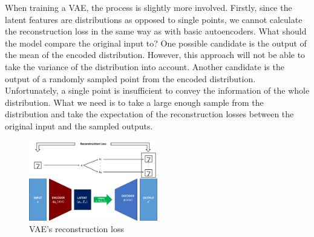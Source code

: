             When training a VAE, the process is slightly more involved. Firstly, since the latent features are distributions as opposed to single points, we cannot calculate the reconstruction loss in the same way as with basic autoencoders. What should the model compare the original input to? One possible candidate is the output of the mean of the encoded distribution. However, this approach will not be able to take the variance of the distribution into account. Another candidate is the output of a randomly sampled point from the encoded distribution. Unfortunately, a single point is insufficient to convey the information of the whole distribution. What we need is to take a large enough sample from the distribution and take the expectation of the reconstruction losses between the original input and the sampled outputs.
            
            \begin{figure}[H]
                \centering
                \includegraphics[width=0.5\textwidth]{imgs/recon_loss.png}
                \caption{VAE's reconstruction loss}
                \label{fig:recon_loss}
            \end{figure}
            
